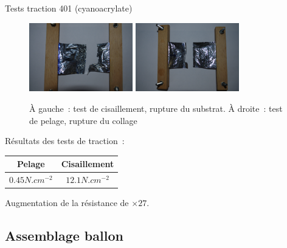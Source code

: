 \begin{frame}{Tests traction 401 (cyanoacrylate)}
  \begin{figure}[!t]
    \centering
    \includegraphics[width=4.5cm]{../Images/test_cisaillement.png}
    \includegraphics[width=4.5cm]{../Images/test_pelage.png}
    
    \caption{À gauche~: test de cisaillement, rupture du substrat. À droite~: test de pelage, rupture du collage}
  \end{figure}
  Résultats des tests de traction~:
  \begin{center}
    \begin{tabular}{|c|c|}
      \hline
      Pelage & Cisaillement \\
      \hline
      $0.45 N.cm^{-2}$ & $12.1 N.cm^{-2}$ \\
      \hline
    \end{tabular}
  \end{center}
  Augmentation de la résistance de $\times 27$.
\end{frame}


\subsection{Assemblage ballon}

